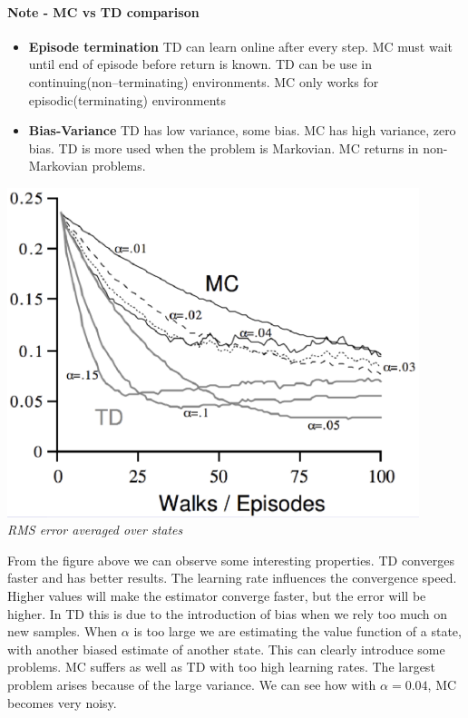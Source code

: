 \documentclass[../main.tex]{subfiles}
\begin{document}
\paragraph{Note - MC vs TD comparison}
\begin{itemize}
    \item \textbf{Episode termination} TD can learn online after every step. MC must wait until end of episode before return is known. TD can be use in continuing(non–terminating) environments. MC only works for episodic(terminating) environments
    \item \textbf{Bias-Variance} TD has low variance, some bias. MC has high variance, zero bias. TD is more used when the problem is Markovian. MC returns in non-Markovian problems.
\end{itemize}
\begin{center}
    \includegraphics[width=120mm]{images/MCvsTD.PNG} \\
    \textit{RMS error averaged over states}
\end{center}
From the figure above we can observe some interesting properties. TD converges faster and has better results. The learning rate influences the convergence speed. Higher values will make the estimator converge faster, but the error will be higher. In TD this is due to the introduction of bias when we rely too much on new samples. When $\alpha$ is too large we are estimating the value function of a state, with another biased estimate of another state. This can clearly introduce some problems. MC suffers as well as TD with too high learning rates. The largest problem arises because of the large variance. We can see how with $\alpha=0.04$, MC becomes very noisy.
\end{document}
